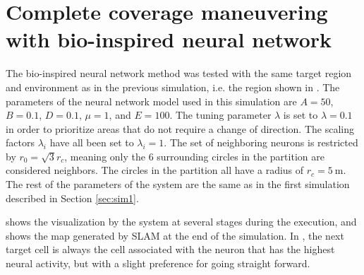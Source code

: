 \section{Complete coverage maneuvering with bio-inspired neural network}

The bio-inspired neural network method was tested with the same target region and environment as in the previous simulation, i.e. the region shown in . The parameters of the neural network model used in this simulation are $A = 50$, $B = 0.1$, $D = 0.1$, $\mu = 1$, and $E = 100$. The tuning parameter $\lambda$ is set to $\lambda = 0.1$ in order to prioritize areas that do not require a change of direction. The scaling factors $\lambda_i$ have all been set to $\lambda_i = 1$. The set of neighboring neurons is restricted by $r_0 = \sqrt{3}r_c$, meaning only the 6 surrounding circles in the partition are considered neighbors. The circles in the partition all have a radius of $r_c = \SI{5}{\meter}$. The rest of the parameters of the system are the same as in the first simulation described in Section \ref{sec:sim1}.

 shows the visualization by the system at several stages during the execution, and  shows the map generated by SLAM at the end of the simulation. In , the next target cell is always the cell associated with the neuron that has the highest neural activity, but with a slight preference for going straight forward.



